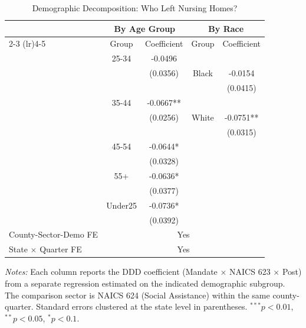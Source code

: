 \begin{table}[htbp]
\centering
\caption{Demographic Decomposition: Who Left Nursing Homes?}
\label{tab:demographics}
\begin{threeparttable}
\begin{tabular}{lcccc}
\hline\hline
 & \multicolumn{2}{c}{By Age Group} & \multicolumn{2}{c}{By Race} \\
\cmidrule(lr){2-3} \cmidrule(lr){4-5}
 & Group & Coefficient & Group & Coefficient \\
\hline
 & 25-34 & -0.0496 \\
 & & (0.0356) & Black & -0.0154 \\
 & & & & (0.0415) \\
 & 35-44 & -0.0667** \\
 & & (0.0256) & White & -0.0751** \\
 & & & & (0.0315) \\
 & 45-54 & -0.0644* \\
 & & (0.0328) & &  \\
 & 55+ & -0.0636* \\
 & & (0.0377) & &  \\
 & Under25 & -0.0736* \\
 & & (0.0392) & &  \\
\hline
County-Sector-Demo FE & \multicolumn{4}{c}{Yes} \\
State $\times$ Quarter FE & \multicolumn{4}{c}{Yes} \\
\hline\hline
\end{tabular}
\begin{tablenotes}[flushleft]
\small
\item \textit{Notes:} Each column reports the DDD coefficient (Mandate $\times$ NAICS 623 $\times$ Post) from a separate regression estimated on the indicated demographic subgroup. The comparison sector is NAICS 624 (Social Assistance) within the same county-quarter. Standard errors clustered at the state level in parentheses. $^{***}p<0.01$, $^{**}p<0.05$, $^{*}p<0.1$.
\end{tablenotes}
\end{threeparttable}
\end{table}
